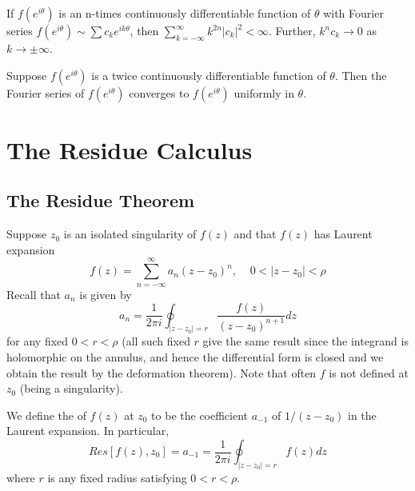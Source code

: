 \documentclass[12pt, a4paper, oneside, openright, titlepage]{book}
\begin{document}
\begin{cor}
    If $f(e^{i\theta})$ is an n-times continuously differentiable function of $\theta$ with Fourier series $f(e^{i\theta}) \sim \sum c_ke^{ik\theta}$, then $\sum_{k=-\infty}^{\infty}k^{2n}|c_k|^2 < \infty$. Further, $k^nc_k\rightarrow 0$ as $k\rightarrow \pm\infty$.
\end{cor}

\begin{thm}
    Suppose $f(e^{i\theta})$ is a twice continuously differentiable function of $\theta$. Then the Fourier series of $f(e^{i\theta})$ converges to $f(e^{i\theta})$ uniformly in $\theta$.
\end{thm}

    

\chapter{The Residue Calculus}



\section{The Residue Theorem}



Suppose $z_0$ is an isolated singularity of $f(z)$ and that $f(z)$ has Laurent expansion \begin{equation*}
    f(z) = \sum_{n=-\infty}^{\infty}a_n(z-z_0)^n,\;\;\;\;0<|z-z_0|<\rho
\end{equation*}
Recall that $a_n$ is given by \begin{equation*}
    a_n = \frac{1}{2\pi i}\oint_{|z-z_0| = r}\frac{f(z)}{(z-z_0)^{n+1}}dz
\end{equation*}
for any fixed $0 < r <\rho$ (all such fixed $r$ give the same result since the integrand is holomorphic on the annulus, and hence the differential form is closed and we obtain the result by the deformation theorem). Note that often $f$ is not defined at $z_0$ (being a singularity).

\begin{defn}
    We define the  of $f(z)$ at $z_0$ to be the coefficient $a_{-1}$ of $1/(z-z_0)$ in the Laurent expansion. In particular, \begin{equation*}
        Res[f(z),z_0] = a_{-1} = \frac{1}{2\pi i}\oint_{|z-z_0|=r}f(z)dz
    \end{equation*}
    where $r$ is any fixed radius satisfying $0 < r < \rho$.
\end{defn}
\end{document}
